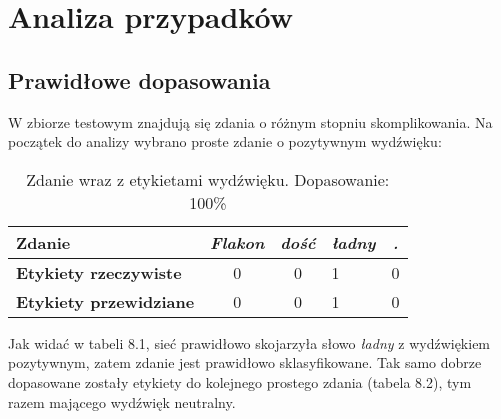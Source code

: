 \chapter{Analiza przypadków}
\label{cha:analiza}

\section{Prawidłowe dopasowania}
\label{cha:prawidlowe}

W zbiorze testowym znajdują się zdania o różnym stopniu skomplikowania. Na początek do analizy wybrano proste zdanie o pozytywnym wydźwięku:
\begin{table}[H]
\centering
\begin{tabular}{|l|c|c|l|c|}
\hline
\textbf{Zdanie}                & \textit{Flakon} & \textit{dość} & \textit{ładny} & \textit{.} \\ \hline
\textbf{Etykiety rzeczywiste}  & 0               & 0             & 1              & 0          \\ \hline
\textbf{Etykiety przewidziane} & 0               & 0             & 1              & 0          \\ \hline
\end{tabular}
\caption{Zdanie wraz z etykietami wydźwięku. Dopasowanie: 100\%}
\label{table:bf-sa}
\end{table}
Jak widać w tabeli 8.1, sieć prawidłowo skojarzyła słowo \textit{ładny} z wydźwiękiem pozytywnym, zatem zdanie jest prawidłowo sklasyfikowane. Tak samo dobrze dopasowane zostały etykiety do kolejnego prostego zdania (tabela 8.2), tym razem mającego wydźwięk neutralny.

